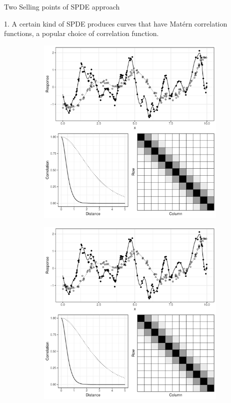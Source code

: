 \documentclass{beamer}
\begin{document}
\begin{frame}{Two Selling points of SPDE approach} 

1. A certain kind of SPDE produces curves that have Mat\'ern correlation functions, a popular choice of correlation function. 

  \begin{figure}[h]
  \begin{figure}[h]
    \begin{center}
      \includegraphics[height=0.4\textheight, trim={0 9cm 0 0}, clip]{figures/smooth_corr.pdf}
    \end{center}
  \end{figure}
    \begin{figure}[h]
    \begin{center}
      \includegraphics[height=0.35\textheight, trim={0 0 9cm 9cm}, clip]{figures/smooth_corr.pdf}

\end{center}
\end{figure}
\end{figure}
\end{frame}
\end{document}
